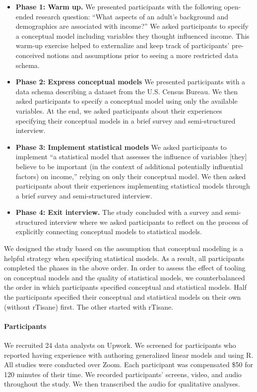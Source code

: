 \begin{itemize}
    \item \textbf{Phase 1: Warm up.} We presented participants with the
    following open-ended research question: ``What aspects of an adult’s
    background and demographics are associated with income?'' We asked
    participants to specify a conceptual model including variables they thought
    influenced income. This warm-up exercise helped to externalize and keep
    track of participants' pre-conceived notions and assumptions prior to seeing
    a more restricted data schema.
    \item \textbf{Phase 2: Express conceptual models} We presented participants
    with a data schema describing a dataset from the U.S. Census Bureau. We then
    asked participants to specify a conceptual model using only the available
    variables. At the end, we asked participants about their
    experiences specifying their conceptual models in a brief survey and semi-structured interview.
    \item \textbf{Phase 3: Implement statistical models} We asked participants
    to implement ``a statistical model that assesses the influence of variables
    [they] believe to be important (in the context of additional potentially
    influential factors) on income,'' relying on only their conceptual model. We
    then asked participants about their experiences implementing statistical
    models through a brief survey and semi-structured interview. 
    \item \textbf{Phase 4: Exit interview.} The study concluded with a survey
    and semi-structured interview where we asked participants to reflect on the
    process of explicitly connecting conceptual models to statistical models.
\end{itemize} 

We designed the study based on the assumption that conceptual modeling is a
helpful strategy when specifying statistical models. As a result, all
participants completed the phases in the above order. In order to assess the
effect of tooling on conceptual models and the quality of statistical models, we
counterbalanced the order in which participants specified conceptual and
statistical models. Half the participants specified their conceptual and
statistical models on their own (without rTisane) first. The other started with
rTisane.

\noindent \paragraph{Participants} We recruited 24 data analysts on Upwork. We
screened for participants who reported having experience with authoring
generalized linear models and using R.  All studies were conducted over Zoom. Each participant was
compensated \$50 for 120 minutes of their time. We recorded participants'
screens, video, and audio throughout the study. We then transcribed the audio
for qualitative analyses.

